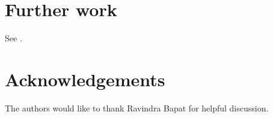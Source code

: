 \documentclass{amsart}
\theoremstyle{definition}
\begin{document}
\section{Further work}

See \cite{richman-shokrieh-wu}.

\section*{Acknowledgements}
The authors would like to thank Ravindra Bapat for helpful discussion.


 

\end{document}
